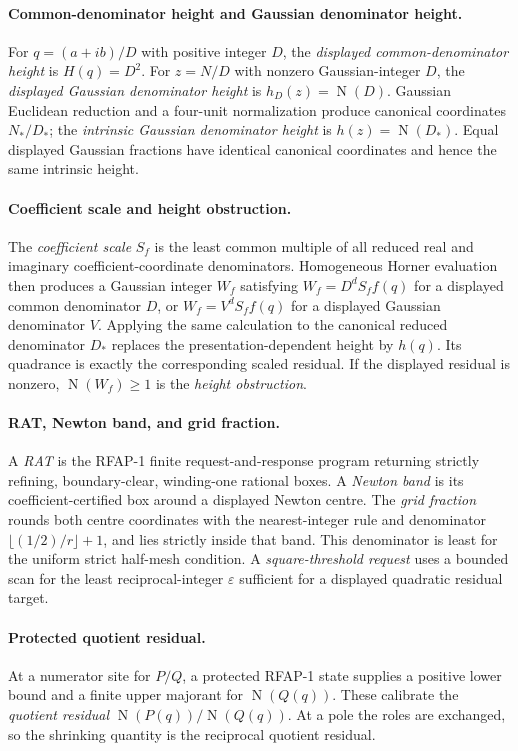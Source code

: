 \documentclass[11pt]{article}
\newcommand{\Norm}[1]{\operatorname{N}\!\left(#1\right)}
\newcommand{\eps}{\varepsilon}
\begin{document}
\paragraph{Common-denominator height and Gaussian denominator height.}
For $q=(a+ib)/D$ with positive integer $D$, the
\emph{displayed common-denominator height} is $H(q)=D^2$.  For
$z=N/D$ with nonzero Gaussian-integer $D$, the \emph{displayed Gaussian
denominator height} is $h_D(z)=\Norm D$.  Gaussian Euclidean reduction and
a four-unit normalization produce canonical coordinates $N_*/D_*$; the
\emph{intrinsic Gaussian denominator height} is $h(z)=\Norm{D_*}$.
Equal displayed Gaussian fractions have identical canonical coordinates and
hence the same intrinsic height.

\paragraph{Coefficient scale and height obstruction.}
The \emph{coefficient scale} $S_f$ is the least common multiple of all
reduced real and imaginary coefficient-coordinate denominators.  Homogeneous
Horner evaluation then produces a Gaussian integer $W_f$ satisfying
$W_f=D^dS_ff(q)$ for a displayed common denominator $D$, or
$W_f=V^dS_ff(q)$ for a displayed Gaussian denominator $V$.  Applying the
same calculation to the canonical reduced denominator $D_*$ replaces the
presentation-dependent height by $h(q)$.  Its quadrance is exactly the
corresponding scaled residual.  If the displayed residual is nonzero,
$\Norm{W_f}\ge1$ is the \emph{height obstruction}.

\paragraph{RAT, Newton band, and grid fraction.}
A \emph{RAT} is the RFAP-1 finite request-and-response program returning
strictly refining, boundary-clear, winding-one rational boxes.  A
\emph{Newton band} is its coefficient-certified box around a displayed Newton
centre.  The \emph{grid fraction} rounds both centre coordinates with the
nearest-integer rule and denominator $\lfloor(1/2)/r\rfloor+1$, and lies
strictly inside that band.  This denominator is least for the uniform strict
half-mesh condition.  A \emph{square-threshold request} uses a bounded scan
for the least reciprocal-integer $\eps$ sufficient for a displayed quadratic
residual target.

\paragraph{Protected quotient residual.}
At a numerator site for $P/Q$, a protected RFAP-1 state supplies a positive
lower bound and a finite upper majorant for $\Norm{Q(q)}$.  These calibrate the
\emph{quotient residual} $\Norm{P(q)}/\Norm{Q(q)}$.  At a pole the roles are
exchanged, so the shrinking quantity is the reciprocal quotient residual.
\end{document}
